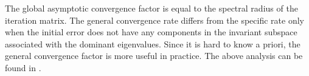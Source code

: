 The global asymptotic convergence factor is equal to the spectral radius of the iteration matrix. 
The general convergence rate differs from the specific rate only when the initial error does not have any components in the invariant subspace associated with the dominant eigenvalues. Since it is hard to know a priori, the general convergence factor is more useful in practice. The above analysis can be found in \citep{doi:10.1137/1.9780898718003}.

